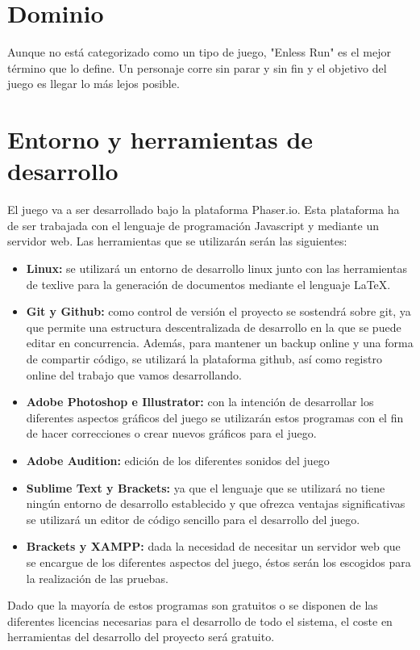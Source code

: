 \documentclass[palatino]{apuntes}
\begin{document}
\section{Dominio}
Aunque no está categorizado como un tipo de juego, "Enless Run" es el mejor término que lo define. Un personaje corre sin parar y sin fin y el objetivo del juego es llegar lo más lejos posible.

\section {Entorno y herramientas de desarrollo}
El juego va a ser desarrollado bajo la plataforma Phaser.io. Esta plataforma ha de ser trabajada con el lenguaje de programación Javascript y mediante un servidor web. Las herramientas que se utilizarán serán las siguientes:

\begin{itemize}
	\item \textbf{Linux:} se utilizará un entorno de desarrollo linux junto con las herramientas de texlive para la generación de documentos mediante el lenguaje \LaTeX.
	\item \textbf{Git y Github:} como control de versión el proyecto se sostendrá sobre git, ya que permite una estructura descentralizada de desarrollo en la que se puede editar en concurrencia. Además, para mantener un backup online y una forma de compartir código, se utilizará la plataforma github, así como registro online del trabajo que vamos desarrollando.
	\item \textbf{Adobe Photoshop e Illustrator:} con la intención de desarrollar los diferentes aspectos gráficos del juego se utilizarán estos programas con el fin de hacer correcciones o crear nuevos gráficos para el juego.
	\item \textbf{Adobe Audition:} edición de los diferentes sonidos del juego
	\item \textbf{Sublime Text y Brackets:} ya que el lenguaje que se utilizará no tiene ningún entorno de desarrollo establecido y que ofrezca ventajas significativas se utilizará un editor de código sencillo para el desarrollo del juego.
	\item \textbf{Brackets y XAMPP:} dada la necesidad de necesitar un servidor web que se encargue de los diferentes aspectos del juego, éstos serán los escogidos para la realización de las pruebas.
\end{itemize}

Dado que la mayoría de estos programas son gratuitos o se disponen de las diferentes licencias necesarias para el desarrollo de todo el sistema, el coste en herramientas del desarrollo del proyecto será gratuito.
\end{document}
